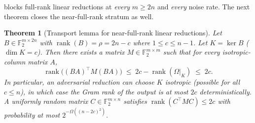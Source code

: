 \documentclass[11pt,a4paper]{article}
\theoremstyle{plain}
\newtheorem{theorem}{Theorem}[section]
\theoremstyle{definition}
\newcommand{\F}{\mathbb{F}}
\begin{document}
 blocks full-rank linear reductions at \emph{every} $m \ge 2n$ and \emph{every} noise rate. The next theorem closes the near-full-rank stratum as well.

\begin{theorem}[Transport lemma for near-full-rank linear reductions]
\label{thm:transport-nearfull}
Let $B \in \F_2^{m \times 2n}$ with $\operatorname{rank}(B) = \rho = 2n-c$ where $1 \le c \le n-1$. Let $K = \ker B$ ($\dim K = c$). Then there exists a matrix $M \in \F_2^{m \times m}$ such that for every isotropic-column matrix $A$,
\[
\operatorname{rank}\bigl((BA)^{\top} M (BA)\bigr) \;\le\; 2c - \operatorname{rank}(\Omega|_K) \;\le\; 2c.
\]
In particular, an adversarial reduction can choose $K$ isotropic (possible for all $c \le n$), in which case the Gram rank of the output is at most $2c$ deterministically. A uniformly random matrix $C \in \F_2^{m \times n}$ satisfies $\operatorname{rank}(C^{\top} M C) \le 2c$ with probability at most $2^{-\Omega((n-2c)^2)}$.
\end{theorem}
\end{document}
